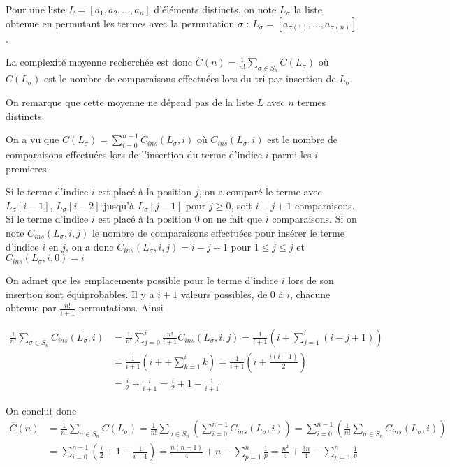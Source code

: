 Pour une liste $L = [a_1, a_2, \ldots, a_{n}]$ d'éléments distincts, on note $L_\sigma$ la liste obtenue en permutant les termes avec la permutation $\sigma$ : $L_\sigma = [a_{\sigma(1)}, \ldots, a_{\sigma(n)}]$. 

La complexité moyenne recherchée est donc $\displaystyle \overline C(n) = \frac 1{n!}\sum_{\sigma\in S_n} C(L_\sigma)$
où $C(L_\sigma)$ est le nombre de comparaisons effectuées lors du tri par insertion de $L_\sigma$.

On remarque que cette moyenne ne dépend pas de la liste $L$ avec $n$ termes distincts.

On a vu que $\displaystyle C(L_\sigma) = \sum_{i=0}^{n-1} C_{ins}(L_\sigma, i)$ où $C_{ins}(L_\sigma, i)$ est le nombre de comparaisons effectuées lors de l'insertion du terme d'indice $i$ parmi les $i$ premieres.

Si le terme d'indice $i$ est placé à la position $j$, on a comparé le terme avec $L_{\sigma}[i-1]$, $L_{\sigma}[i-2]$ jusqu'à $L_{\sigma}[j-1]$ pour $j\ge 0$, soit $i-j+1$ comparaisons. Si le terme d'indice $i$ est placé à la position $0$ on ne fait que $i$ comparaisons. Si on note $C_{ins}(L_\sigma, i, j)$ le nombre de comparaisons effectuées pour insérer le terme d'indice $i$ en $j$, on a donc $C_{ins}(L_\sigma, i, j) = i-j+1$ pour $1\le j\le j$ et $C_{ins}(L_\sigma, i, 0) = i$
 
On admet que les emplacements possible pour le terme d'indice $i$ lors de son insertion sont équiprobables. Il y a $i+1$ valeurs possibles, de 0 à $i$, chacune obtenue par $\frac{n!}{i+1}$ permutations. Ainsi

\begin{align*}
\frac 1{n!}\sum_{\sigma\in S_n} C_{ins}(L_\sigma, i)
&=\frac 1{n!} \sum_{j=0}^{i} \frac{n!}{i+1}C_{ins}(L_\sigma, i, j)
=\frac{1}{i+1}\left(i + \sum_{j=1}^i (i-j+1)\right)\\
&=\frac{1}{i+1}\left(i + + \sum_{k=1}^i k\right)
=\frac{1}{i+1}\left(i + \frac{i(i+1)}2\right)\\
&=\frac{i}{2}+\frac{i}{i+1}
=\frac{i}{2}+1 - \frac 1{i+1}
\end{align*}

On conclut donc
\begin{align*}
\overline C(n) 
&= \frac 1{n!}\sum_{\sigma\in S_n} C(L_\sigma)
=\frac 1{n!}\sum_{\sigma\in S_n} \left(\sum_{i=0}^{n-1} C_{ins}(L_\sigma, i)\right)
= \sum_{i=0}^{n-1}\left(\frac 1{n!}\sum_{\sigma\in S_n} C_{ins}(L_\sigma, i)\right)\\
&=\sum_{i=0}^{n-1}\left(\frac{i}{2}+1 - \frac 1{i+1}\right)
=\frac{n(n-1)}4 + n -\sum_{p=1}^n \frac 1p
=\frac {n^2} 4 + \frac{3n}4 - \sum_{p=1}^n \frac 1p
\end{align*}

